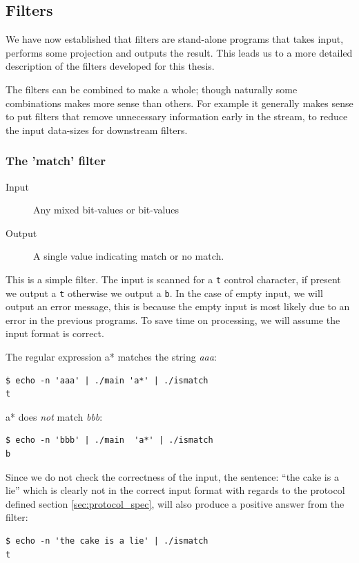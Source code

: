 \subsection{Filters}
We have now established that filters are stand-alone programs that
takes input, performs some projection and outputs the result. 
This leads us to a more detailed description of the filters
developed for this thesis. 

The filters can be combined to make a whole; though naturally some 
combinations makes more sense than others. For example it generally makes sense
to put filters that remove unnecessary information early in the stream,
to reduce the input data-sizes for downstream filters.




\subsubsection{The 'match' filter}

\begin{description}
    \item[Input] Any mixed bit-values or bit-values
    \item[Output] A single value indicating match or no match.
\end{description}

This is a simple filter. The input is scanned for a \texttt{t} control
character, if present we output a \texttt{t} otherwise we output a
\texttt{b}. In the case of empty input, we will output an error
message, this is because the empty input is most likely due to an
error in the previous programs. To save time on processing, we will
assume the input format is correct.

\begin{example}
The regular expression \textsf{a*} matches the string \textsl{aaa}:
\begin{verbatim}
$ echo -n 'aaa' | ./main 'a*' | ./ismatch 
t
\end{verbatim}
\textsf{a*} does \emph{not} match \textsl{bbb}:
\begin{verbatim}
$ echo -n 'bbb' | ./main  'a*' | ./ismatch 
b
\end{verbatim}
Since we do not check the correctness of the input, the sentence:
``the cake is a lie'' which is clearly not in the correct input format
with regards to the protocol defined section \vref{sec:protocol_spec},
will also produce a positive answer from the filter:
\begin{verbatim}
$ echo -n 'the cake is a lie' | ./ismatch
t
\end{verbatim}

\end{example}

